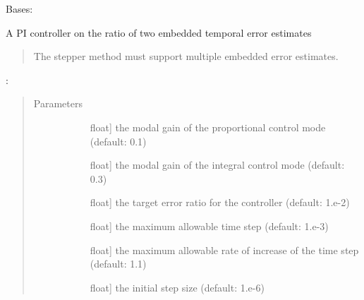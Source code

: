 \documentclass[letterpaper,10pt,english]{sphinxmanual}
\begin{document}
\begin{fulllineitems}
\label{\detokenize{spitfire.time.stepcontrol:spitfire.time.stepcontrol.RatioController}}
Bases: 

A PI controller on the ratio of two embedded temporal error estimates
\begin{quote}

The stepper method must support multiple embedded error estimates.
\end{quote}

:
\begin{quote}\begin{description}
\item[{Parameters}] \leavevmode\begin{description}
\item[{}] \leavevmode{[}float{]}
the modal gain of the proportional control mode (default: 0.1)

\item[{}] \leavevmode{[}float{]}
the modal gain of the integral control mode (default: 0.3)

\item[{}] \leavevmode{[}float{]}
the target error ratio for the controller (default: 1.e-2)

\item[{}] \leavevmode{[}float{]}
the maximum allowable time step (default: 1.e-3)

\item[{}] \leavevmode{[}float{]}
the maximum allowable rate of increase of the time step (default: 1.1)

\item[{}] \leavevmode{[}float{]}
the initial step size (default: 1.e-6)

\end{description}

\end{description}\end{quote}


\end{fulllineitems}
\end{document}
